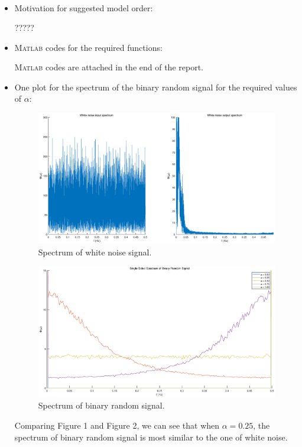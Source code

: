 \documentclass[10pt,a4paper]{article}
\begin{document}
\begin{itemize}
\begin{align*}
	\end{align*}
    \item Motivation for suggested model order:
    \par ?????
    \item \textsc{Matlab} codes for the required functions:
    \par \textsc{Matlab} codes are attached in the end of the report.
    \item One plot for the spectrum of the binary random signal for the required values of $\alpha$:
    \begin{figure}[ht]
		\footnotesize
		\centering 
		\includegraphics[width=\columnwidth]{chooseAlpha_0_25.eps} 
		\caption{Spectrum of white noise signal.}
		\label{fig:workingRegion}
	\end{figure}
	\begin{figure}[ht]
		\footnotesize
		\centering 
		\includegraphics[width=\columnwidth]{spectrumAlpha.eps} 
		\caption{Spectrum of binary random signal.}
		\label{fig:workingRegion}
	\end{figure}
	\par Comparing Figure 1 and Figure 2, we can see that when $\alpha = 0.25$, the spectrum of binary random signal is most similar to the one of white noise.
\end{itemize}
\end{document}
